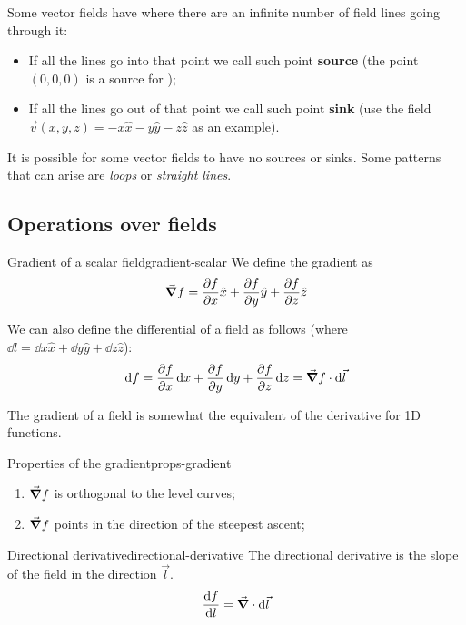 \documentclass[12pt]{extarticle}
\begin{document}
Some vector fields have  where there are an infinite number of field lines going through it:
\begin{itemize}
    \item If all the lines go into that point we call such point \textbf{source} (the point $(0,0,0)$ is a source for );
    \item If all the lines go out of that point we call such point \textbf{sink} (use the field $\vec v(x, y, z) = -x \hat x - y \hat y - z \hat z$ as an example).
\end{itemize}
It is possible for some vector fields to have no sources or sinks. Some patterns that can arise are \textit{loops} or \textit{straight lines}.

\subsection{Operations over fields}

\begin{definition}{Gradient of a scalar field}{gradient-scalar}
    We define the gradient as
    \begin{equation}
        \grad f = \pdv{f}{x} \hat{x} + \pdv{f}{y} \hat{y} + \pdv{f}{z} \hat{z}
    \end{equation}

    We can also define the differential of a field as follows (where $\dd{l} = \dd{x} \hat{x} + \dd{y} \hat{y} + \dd{z} \hat{z} $):
    \begin{equation}
        \dd{f} = \pdv{f}{x} \dd{x} + \pdv{f}{y} \dd{y} + \pdv{f}{z} \dd{z} = \grad f \cdot \dd{\vec l}
    \end{equation}
\end{definition}

The gradient of a field is somewhat the equivalent of the derivative for 1D functions.

\begin{proposition}{Properties of the gradient}{props-gradient}
    \begin{enumerate}[label=\roman*.]
        \item $\grad f$ is orthogonal to the level curves;
        \item $\grad f$ points in the direction of the steepest ascent;
    \end{enumerate}
\end{proposition}

\begin{definition}{Directional derivative}{directional-derivative}
    The directional derivative is the slope of the field in the direction $\vec l$.
    \begin{equation}
        \dv{f}{l} = \grad \cdot \dd{\vec l}
    \end{equation}
\end{definition}
\end{document}
